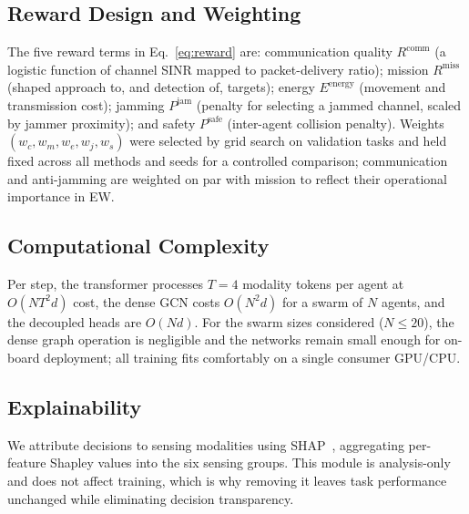 \documentclass[journal]{IEEEtran}
\begin{document}
\subsection{Reward Design and Weighting}
The five reward terms in Eq.~\eqref{eq:reward} are: communication quality
$R^{\text{comm}}$ (a logistic function of channel SINR mapped to packet-delivery
ratio); mission $R^{\text{miss}}$ (shaped approach to, and detection of, targets);
energy $E^{\text{energy}}$ (movement and transmission cost); jamming
$P^{\text{jam}}$ (penalty for selecting a jammed channel, scaled by jammer
proximity); and safety $P^{\text{safe}}$ (inter-agent collision penalty). Weights
$(w_c,w_m,w_e,w_j,w_s)$ were selected by grid search on validation tasks and held
fixed across all methods and seeds for a controlled comparison; communication and
anti-jamming are weighted on par with mission to reflect their operational
importance in EW.

\subsection{Computational Complexity}
Per step, the transformer processes $T{=}4$ modality tokens per agent at
$O(N T^2 d)$ cost, the dense GCN costs $O(N^2 d)$ for a swarm of $N$ agents, and
the decoupled heads are $O(N d)$. For the swarm sizes considered ($N\!\le\!20$),
the dense graph operation is negligible and the networks remain small enough for
on-board deployment; all training fits comfortably on a single consumer GPU/CPU.

\subsection{Explainability}
We attribute decisions to sensing modalities using SHAP~\cite{lundberg2017unified},
aggregating per-feature Shapley values into the six sensing groups. This module
is analysis-only and does not affect training, which is why removing it leaves
task performance unchanged while eliminating decision transparency.
\end{document}
